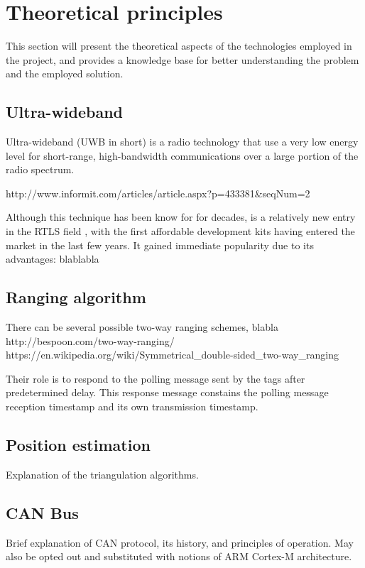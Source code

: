 \section{Theoretical principles}\label{sec:theory}
This section will present the theoretical aspects of the technologies employed in the project, and provides a knowledge base for better understanding the problem and the employed solution.


\subsection{Ultra-wideband}
Ultra-wideband (UWB in short) is a radio technology that use a very low energy level for short-range, high-bandwidth communications over a large portion of the radio spectrum.

http://www.informit.com/articles/article.aspx?p=433381&seqNum=2

Although this technique has been know for for decades, is a relatively new entry in the RTLS field \cite{uwb1}, with the first affordable development kits having entered the market in the last few years.
It gained immediate popularity due to its advantages: blablabla


\subsection{Ranging algorithm}
There can be several possible two-way ranging schemes, blabla
http://bespoon.com/two-way-ranging/
https://en.wikipedia.org/wiki/Symmetrical_double-sided_two-way_ranging

Their role is to respond to the polling message sent by the tags after predetermined delay. This response message constains the polling message reception timestamp and its own transmission timestamp.

\subsection{Position estimation}
Explanation of the triangulation algorithms.

\subsection{CAN Bus}
Brief explanation of CAN protocol, its history, and principles of operation.
May also be opted out and substituted with notions of ARM Cortex-M architecture.

